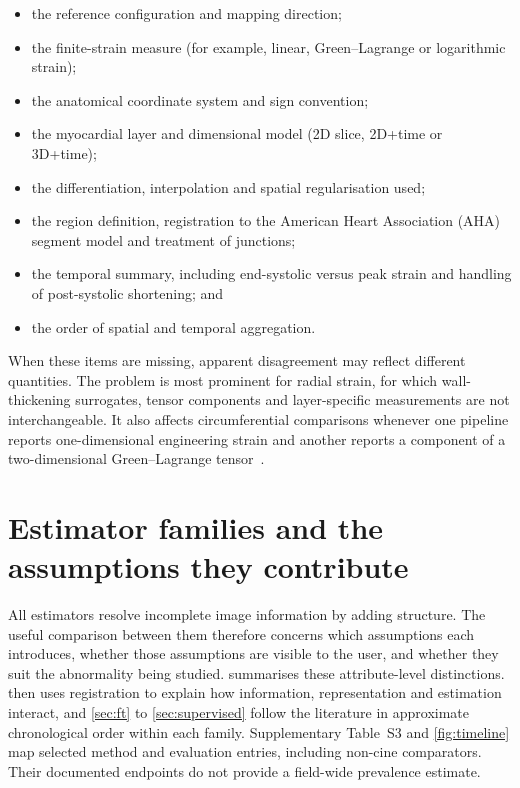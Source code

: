 \begin{itemize}
\item the reference configuration and mapping direction;
\item the finite-strain measure (for example, linear, Green--Lagrange or logarithmic strain);
\item the anatomical coordinate system and sign convention;
\item the myocardial layer and dimensional model (2D slice, 2D+time or 3D+time);
\item the differentiation, interpolation and spatial regularisation used;
\item the region definition, registration to the American Heart Association (AHA) segment model and treatment of junctions;
\item the temporal summary, including end-systolic versus peak strain and handling of post-systolic shortening; and
\item the order of spatial and temporal aggregation.
\end{itemize}

When these items are missing, apparent disagreement may reflect different quantities. The problem is most prominent for radial strain, for which wall-thickening surrogates, tensor components and layer-specific measurements are not interchangeable. It also affects circumferential comparisons whenever one pipeline reports one-dimensional engineering strain and another reports a component of a two-dimensional Green--Lagrange tensor~\cite{wehner2018,cao2018}.

\section{Estimator families and the assumptions they contribute}\label{sec:families}

All estimators resolve incomplete image information by adding structure. The useful comparison between them therefore concerns which assumptions each introduces, whether those assumptions are visible to the user, and whether they suit the abnormality being studied.  summarises these attribute-level distinctions.  then uses registration to explain how information, representation and estimation interact, and \cref{sec:ft} to \cref{sec:supervised} follow the literature in approximate chronological order within each family. Supplementary Table~S3 and \cref{fig:timeline} map selected method and evaluation entries, including non-cine comparators. Their documented endpoints do not provide a field-wide prevalence estimate.

